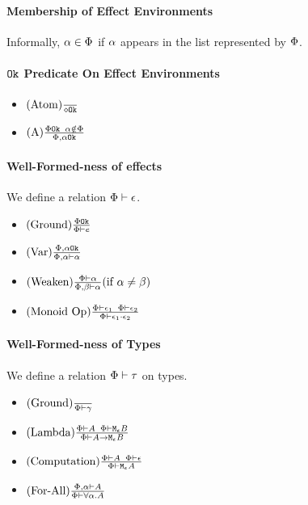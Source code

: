{\paragraph{Membership of Effect Environments}
Informally, $\a \in \P$ if $\a$ appears in the list represented by $\P$.

\paragraph{$\ok{}$ Predicate On Effect Environments}
\begin{itemize}
    \item $\treerule{Atom}{}{\ok{\nil}}$
    \item $\treerule{A}{\ok{\P} \s\s \a\notin \P}{\ok{\P, \a}}$
\end{itemize}

\paragraph{Well-Formed-ness of effects}
We define a relation $\wellformed{\P}{\e}$.

\begin{itemize}
    \item $\treerule{Ground}{\ok{\P}}{\wellformed{\P}{e}}$
    \item $\treerule{Var}{\ok{\P,\a}}{\wellformed{\P,\a}{\a}}$
    \item $\condtreerule{Weaken}{\wellformed{\P}{\a}}{\wellformed{\P,\b}{\a}}{\a\neq\b}$
    \item $\treerule{Monoid Op}{\wellformed{\P}{\e_1}\s\s\wellformed{\P}{\e_2}}{\wellformed{\P}{\e_1\dot\e_2}}$
\end{itemize}

\paragraph{Well-Formed-ness of Types}
We define a relation $\wellformed{\P}{\tau}$ on types.

\begin{itemize}
    \item $\treerule{Ground}{}{\wellformed{\P}{\g}}$
    \item $\treerule{Lambda}{\wellformed{\P}{A}\s\s\wellformed{\P}{\meb}}{\wellformed{\P}{\aeb}}$
    \item $\treerule{Computation}{\wellformed{\P}{A}\s\s\wellformed{\P}{\e}}{\wellformed{\P}{\mea}}$
    \item $\treerule{For-All}{\wellformed{\P,\a}{A}}{\wellformed{\P}{\all{\a}{A}}}$
\end{itemize}

}
